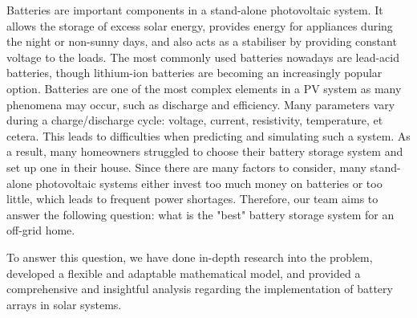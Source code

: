 Batteries are important components in a stand-alone photovoltaic system. It allows the storage of excess solar energy, provides energy for appliances during the night or non-sunny days, and also acts as a stabiliser by providing constant voltage to the loads. The most commonly used batteries nowadays are lead-acid batteries, though lithium-ion batteries are becoming an increasingly popular option. Batteries are one of the most complex elements in a PV system as many phenomena may occur, such as discharge and efficiency. Many parameters vary during a charge/discharge cycle: voltage, current, resistivity, temperature, et cetera. This leads to difficulties when predicting and simulating such a system. As a result, many homeowners struggled to choose their battery storage system and set up one in their house. Since there are many factors to consider, many stand-alone photovoltaic systems either invest too much money on batteries or too little, which leads to frequent power shortages. Therefore, our team aims to answer the following question: what is the "best" battery storage system for an off-grid home.

To answer this question, we have done in-depth research into the problem, developed a flexible and adaptable mathematical model, and provided a comprehensive and insightful analysis regarding the implementation of battery arrays in solar systems.
